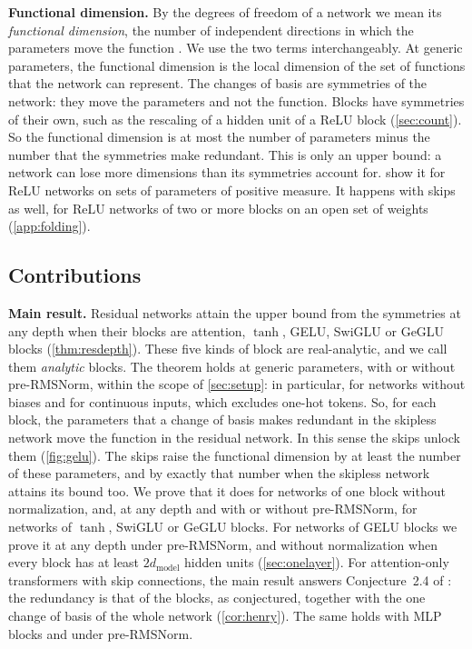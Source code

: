 \documentclass[10pt]{article}
\theoremstyle{definition}
\theoremstyle{remark}
\newcommand{\dm}{d_{\mathrm{model}}}
\newcommand{\para}[1]{\smallskip\noindent\textbf{#1}\hspace{0.5em}}
\begin{document}
\para{Functional dimension.} By the degrees of freedom of a network we mean its \emph{functional dimension}, the number of independent directions in which the parameters move the function \citep{grigsby2022functional}. We use the two terms interchangeably. At generic parameters, the functional dimension is the local dimension of the set of functions that the network can represent. The changes of basis are symmetries of the network: they move the parameters and not the function. Blocks have symmetries of their own, such as the rescaling of a hidden unit of a ReLU block (\cref{sec:count}). So the functional dimension is at most the number of parameters minus the number that the symmetries make redundant. This is only an upper bound: a network can lose more dimensions than its symmetries account for. \citet{grigsby2023hidden} show it for ReLU networks on sets of parameters of positive measure. It happens with skips as well, for ReLU networks of two or more blocks on an open set of weights (\cref{app:folding}).

\subsection{Contributions}\label{sec:contributions}

\para{Main result.} Residual networks attain the upper bound from the symmetries at any depth when their blocks are attention, $\tanh$, GELU, SwiGLU or GeGLU blocks (\cref{thm:resdepth}). These five kinds of block are real-analytic, and we call them \emph{analytic} blocks. The theorem holds at generic parameters, with or without pre-RMSNorm, within the scope of \cref{sec:setup}: in particular, for networks without biases and for continuous inputs, which excludes one-hot tokens. So, for each block, the parameters that a change of basis makes redundant in the skipless network move the function in the residual network. In this sense the skips unlock them (\cref{fig:gelu}). The skips raise the functional dimension by at least the number of these parameters, and by exactly that number when the skipless network attains its bound too. We prove that it does for networks of one block without normalization, and, at any depth and with or without pre-RMSNorm, for networks of $\tanh$, SwiGLU or GeGLU blocks. For networks of GELU blocks we prove it at any depth under pre-RMSNorm, and without normalization when every block has at least $2\dm$ hidden units (\cref{sec:onelayer}). For attention-only transformers with skip connections, the main result answers Conjecture~2.4 of \citet{henry2026generic}: the redundancy is that of the blocks, as conjectured, together with the one change of basis of the whole network (\cref{cor:henry}). The same holds with MLP blocks and under pre-RMSNorm.
\end{document}
